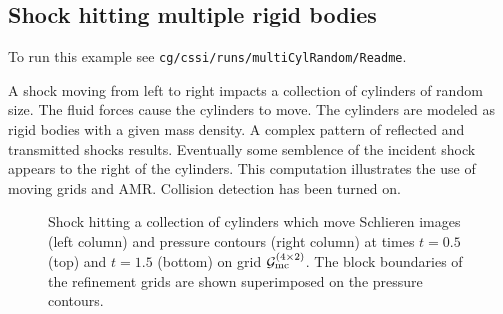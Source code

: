 \newcommand{\Gmc}{\Gc_{\rm mc}}%
\subsection{Shock hitting multiple rigid bodies}\label{sec:shockMultiCyl}

To run this example see {\tt cg/cssi/runs/multiCylRandom/Readme}.

A shock moving from left to right impacts a collection of cylinders of random size. 
The fluid
forces cause the cylinders to move. The cylinders are modeled as rigid bodies with a given mass density.
A complex pattern of reflected and transmitted shocks results. Eventually some semblence of the 
incident shock appears to the right of the cylinders. 
This computation illustrates the use of moving grids and AMR. Collision
detection has been turned on.




{
% 
\newcommand{\figWidth}{6.5cm}
\newcommand{\trimfig}[2]{\trimFigb{#1}{#2}{.05}{.05}{.25}{.25}}
% 
\begin{figure}[htb]
\begin{center}
\end{center}
  \caption{Shock hitting a collection of cylinders which move Schlieren images (left column) and pressure contours (right column)
 at times $t=0.5$ (top) and $t=1.5$ (bottom) on grid $\Gmc^{(4\times 2)}$. The block boundaries of the refinement
   grids are shown superimposed on the pressure contours.}%
  \label{fig:shockMultiCylRandom}
\end{figure}
}


